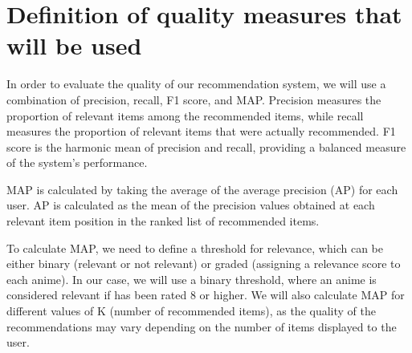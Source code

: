 \section{Definition of quality measures that will be used}
In order to evaluate the quality of our recommendation system, we will use a combination of precision, recall, F1 score, and MAP. Precision measures the proportion of relevant items among the recommended items, while recall measures the proportion of relevant items that were actually recommended. F1 score is the harmonic mean of precision and recall, providing a balanced measure of the system's performance.

MAP is calculated by taking the average of the average precision (AP) for each user. AP is calculated as the mean of the precision values obtained at each relevant item position in the ranked list of recommended items.

To calculate MAP, we need to define a threshold for relevance, which can be either binary (relevant or not relevant) or graded (assigning a relevance score to each anime). In our case, we will use a binary threshold, where an anime is considered relevant if has been rated 8 or higher. We will also calculate MAP for different values of K (number of recommended items), as the quality of the recommendations may vary depending on the number of items displayed to the user.







